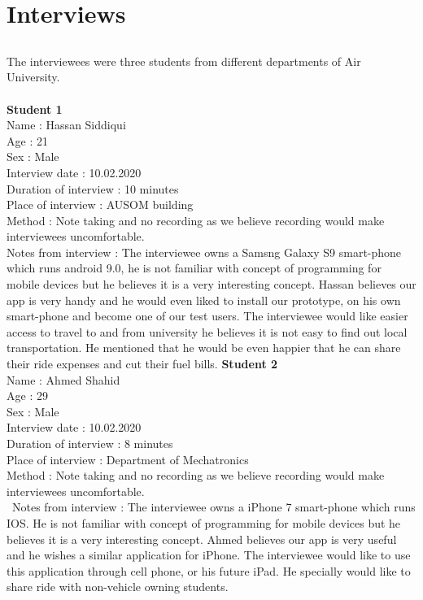 \chapter{Interviews} \label{ap:Appendix1}

\section*{}
The interviewees were three students from different departments of Air University.\\~\\
\large {\textbf{Student 1 }}
\\ Name : Hassan Siddiqui 
\\ Age : 21 
\\ Sex : Male
\\ Interview date : 10.02.2020 
\\ Duration of interview : 10 minutes 
\\ Place of interview : AUSOM building 
\\ Method : Note taking and no recording as we believe recording would make interviewees uncomfortable.
\\ Notes from interview : The interviewee owns a Samsng Galaxy S9 smart-phone which runs android 9.0, he is not familiar with concept of programming for mobile devices but he believes it is a very interesting concept. Hassan believes our app is very handy and he would even liked to install our prototype, on his own smart-phone and become one of our test users. The interviewee would like easier access to travel to and from university he believes it is not easy to find out local transportation. He mentioned that he would be even happier that he can share their ride expenses and cut their fuel bills.\newpage
\large {\textbf{Student 2 }}
\\ Name : Ahmed Shahid
\\ Age : 29 
\\ Sex : Male
\\ Interview date : 10.02.2020 
\\ Duration of interview : 8 minutes 
\\ Place of interview : Department of Mechatronics
\\ Method : Note taking and no recording as we believe recording would make interviewees uncomfortable. \\\ Notes from interview : The interviewee owns a iPhone 7 smart-phone which runs IOS. He is not familiar with concept of programming for mobile devices but he believes it is a very interesting concept. Ahmed believes our app is very useful and he wishes a similar application for iPhone. The interviewee would like to use this application through cell phone, or his future iPad. He specially would like to share ride with non-vehicle owning students.\\~\\
